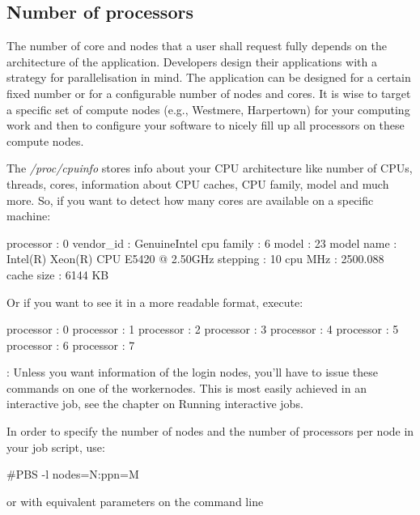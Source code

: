 \subsection{Number of processors}

The number of core and nodes that a user shall request fully depends on the
architecture of the application. Developers design their applications with a
strategy for parallelisation in mind. The application can be designed for a
certain fixed number or for a configurable number of nodes and cores. It is
wise to target a specific set of compute nodes (e.g., Westmere, Harpertown) for
your computing work and then to configure your software to nicely fill up all
processors on these compute nodes.

The \emph{/proc/cpuinfo} stores info about your CPU architecture like number of
CPUs, threads, cores, information about CPU caches, CPU family, model and much
more.  So, if you want to detect how many cores are available on a specific
machine:

\begin{prompt}
processor       : 0
vendor_id       : GenuineIntel
cpu family      : 6
model           : 23
model name      : Intel(R) Xeon(R) CPU  E5420  @ 2.50GHz
stepping        : 10
cpu MHz         : 2500.088
cache size      : 6144 KB
\end{prompt}

Or if you want to see it in a more readable format, execute:

\begin{prompt}
processor : 0
processor : 1
processor : 2
processor : 3
processor : 4
processor : 5
processor : 6
processor : 7
\end{prompt}

: Unless you want information of the login nodes, you'll have to issue these commands
on one of the workernodes. This is most easily achieved in an interactive job, see the chapter on
Running interactive jobs.

In order to specify the number of nodes and the number of processors per node in your job script, use:

\begin{prompt}
#PBS -l nodes=N:ppn=M
\end{prompt}

or with equivalent parameters on the command line

\begin{prompt}
\end{prompt}

